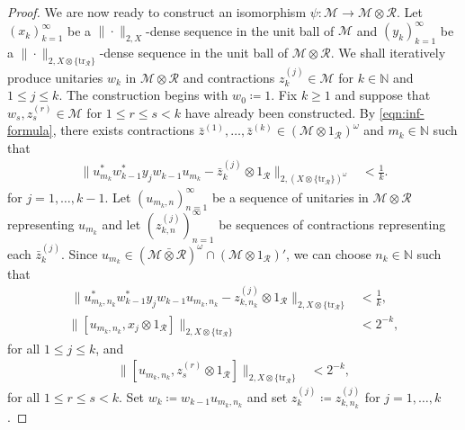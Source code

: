 \documentclass[10pt,a4paper]{amsart}
\newcommand{\M}{\mathcal{M}}
\newcommand{\N}{\mathbb N}
\newcommand{\R}{\mathcal R}
\newcommand{\barotimes}{\bar\otimes}
\newcommand{\tr}{\mathrm{tr}}
\begin{document}
\begin{proof}
We are now ready to construct an isomorphism $\psi\colon \M \rightarrow \M \otimes \R$. 
Let $(x_k)_{k=1}^\infty$ be a $\|\cdot\|_{2,X}$-dense sequence in the unit ball of $\M$ and $(y_k)_{k=1}^\infty$ be a $\|\cdot\|_{2,X \otimes \{\tr_\R\}}$-dense sequence in the unit ball of $\M \otimes \R$. 
We shall iteratively produce unitaries $w_k$ in $\M \otimes \R$ and contractions $z_k^{(j)} \in \M$ for $k\in\mathbb N$ and $1 \leq j \leq k$.
The construction begins with $w_0 \coloneqq 1$. Fix $k \geq 1$ and suppose that $w_s, z^{(r)}_s \in \M$ for $1 \leq r \leq s < k$ have already been constructed.
By \eqref{eqn:inf-formula}, there exists contractions $\bar{z}^{(1)},\ldots,\bar{z}^{(k)} \in  (\M \otimes 1_\R)^\omega$ and $m_k \in \N$ such that
\begin{equation}\begin{split}
	\|u_{m_k}^* w_{k-1}^* y_j w_{k-1}u_{m_k} - \bar{z}_k^{(j)} \otimes 1_\R\|_{2,(X \otimes \{\tr_\R\})^\omega} &< \frac{1}{k}.
\end{split}\end{equation}
for $j=1,\ldots,k-1$.
Let $(u_{m_k,n})_{n=1}^\infty$ be a sequence of unitaries in $\M \otimes \R$ representing $u_{m_k}$ and let $(z^{(j)}_{k,n})_{n=1}^\infty$ be sequences of contractions representing each $\bar{z}_k^{(j)}$. 
Since $u_{m_k} \in (\M \barotimes \R)^\omega \cap (\M \otimes 1_\R)'$, we can choose $n_k \in \N$ such that
\begin{align}\
	\|u_{m_k,n_k}^* w_{k-1}^* y_j w_{k-1}u_{m_k,n_k} - z^{(j)}_{k,n_k} \otimes 1_\R\|_{2,X \otimes \{\tr_\R\}} &< \frac{1}{k},
	\label{eqn:inductive-McDuff1}\\
	\|[u_{m_k,n_k},x_j\otimes 1_\R]\|_{2,X \otimes \{\tr_\R\}} &< 2^{-k}, \label{eqn:inductive-McDuff2}
\end{align}
for all $1 \leq j \leq k$, and 
\begin{equation}\begin{split}\label{eqn:inductive-McDuff3}
	\|[u_{m_k,n_k},z^{(r)}_{s}\otimes 1_\R]\|_{2,X \otimes \{\tr_\R\}} &< 2^{-k},
\end{split}\end{equation}
for all $1\leq r \leq s < k$. 
Set $w_k \coloneqq w_{k-1}u_{m_k,n_k}$ and set $z^{(j)}_k \coloneqq z^{(j)}_{k,n_k}$ for $j=1,\ldots,k$.


\end{proof}
\end{document}
